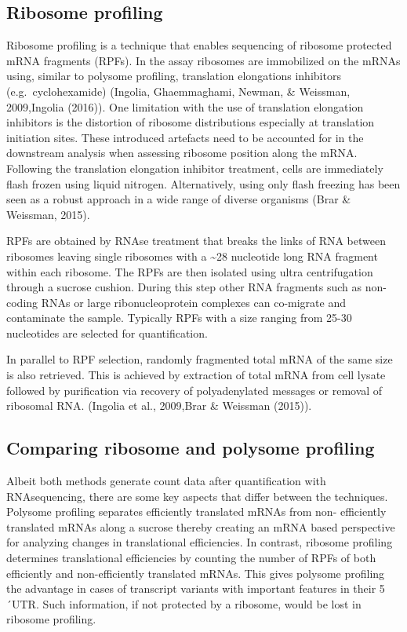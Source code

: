 \documentclass[12pt,openany]{book}
\begin{document}
\subsection{Ribosome profiling} \label{riboseq}

Ribosome profiling is a technique that enables sequencing of ribosome
protected mRNA fragments (RPFs). In the assay ribosomes are immobilized
on the mRNAs using, similar to polysome profiling, translation
elongations inhibitors (e.g.~cyclohexamide) (Ingolia, Ghaemmaghami,
Newman, \& Weissman, 2009,Ingolia (2016)). One limitation with the use
of translation elongation inhibitors is the distortion of ribosome
distributions especially at translation initiation sites. These
introduced artefacts need to be accounted for in the downstream analysis
when assessing ribosome position along the mRNA. Following the
translation elongation inhibitor treatment, cells are immediately flash
frozen using liquid nitrogen. Alternatively, using only flash freezing
has been seen as a robust approach in a wide range of diverse organisms
(Brar \& Weissman, 2015).

RPFs are obtained by RNAse treatment that breaks the links of RNA
between ribosomes leaving single ribosomes with a \textasciitilde{}28
nucleotide long RNA fragment within each ribosome. The RPFs are then
isolated using ultra centrifugation through a sucrose cushion. During
this step other RNA fragments such as non-coding RNAs or large
ribonucleoprotein complexes can co-migrate and contaminate the sample.
Typically RPFs with a size ranging from 25-30 nucleotides are selected
for quantification.

In parallel to RPF selection, randomly fragmented total mRNA of the same
size is also retrieved. This is achieved by extraction of total mRNA
from cell lysate followed by purification via recovery of polyadenylated
messages or removal of ribosomal RNA. (Ingolia et al., 2009,Brar \&
Weissman (2015)).

\subsection{Comparing ribosome and polysome profiling}

Albeit both methods generate count data after quantification with
RNAsequencing, there are some key aspects that differ between the
techniques. Polysome profiling separates efficiently translated mRNAs
from non- efficiently translated mRNAs along a sucrose thereby creating
an mRNA based perspective for analyzing changes in translational
efficiencies. In contrast, ribosome profiling determines translational
efficiencies by counting the number of RPFs of both efficiently and
non-efficiently translated mRNAs. This gives polysome profiling the
advantage in cases of transcript variants with important features in
their 5´UTR. Such information, if not protected by a ribosome, would be
lost in ribosome profiling.
\end{document}
